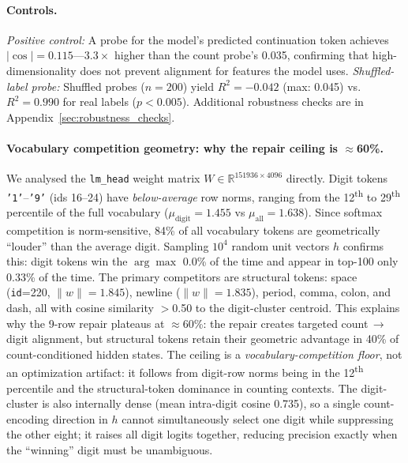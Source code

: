 \documentclass{article}
\begin{document}
\paragraph{Controls.}
\emph{Positive control:} A probe for the model's predicted continuation token achieves
$|\cos| = 0.115$---$3.3\times$ higher than the count probe's 0.035, confirming
that high-dimensionality does not prevent alignment for features the model uses.
\emph{Shuffled-label probe:} Shuffled probes ($n{=}200$) yield $R^2 = -0.042$ (max: 0.045)
vs.\ $R^2 = 0.990$ for real labels ($p < 0.005$).
Additional robustness checks are in Appendix~\ref{sec:robustness_checks}.


\paragraph{Vocabulary competition geometry: why the repair ceiling is $\approx$60\%.}
We analysed the \texttt{lm\_head} weight matrix $W\!\in\!\mathbb{R}^{151936\times4096}$ directly.
Digit tokens \texttt{'1'}--\texttt{'9'} (ids 16--24) have \emph{below-average} row norms,
ranging from the 12\textsuperscript{th} to 29\textsuperscript{th} percentile of the full
vocabulary ($\mu_{\text{digit}}{=}1.455$ vs $\mu_{\text{all}}{=}1.638$).
Since softmax competition is norm-sensitive, 84\% of all vocabulary tokens
are geometrically ``louder'' than the average digit.
Sampling $10^{4}$ random unit vectors $h$ confirms this: digit tokens win the
$\arg\max$ 0.0\% of the time and appear in top-100 only 0.33\% of the time.
The primary competitors are structural tokens: space (\texttt{id}=220, $\|w\|{=}1.845$),
newline ($\|w\|{=}1.835$), period, comma, colon, and dash, all with cosine similarity
$>$0.50 to the digit-cluster centroid.
This explains why the 9-row repair plateaus at $\approx$60\%:
the repair creates targeted count\,$\to$\,digit alignment, but structural tokens
retain their geometric advantage in 40\% of count-conditioned hidden states.
The ceiling is a \emph{vocabulary-competition floor}, not an optimization artifact:
it follows from digit-row norms being in the 12\textsuperscript{th} percentile
and the structural-token dominance in counting contexts.
The digit-cluster is also internally dense (mean intra-digit cosine 0.735),
so a single count-encoding direction in $h$ cannot simultaneously select one
digit while suppressing the other eight; it raises all digit logits together,
reducing precision exactly when the ``winning'' digit must be unambiguous.
\end{document}
